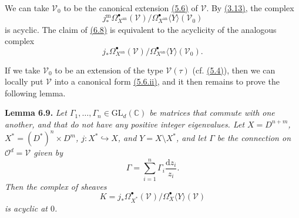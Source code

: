 \documentclass{report}
\newenvironment{itenv}[1]
  {\phantomsection\par\medskip\noindent\textbf{#1.}\itshape}
  {\par\medskip}
\renewcommand{\cal}[1]{{\mathcal{#1}}}
\newcommand{\CC}{\mathbb{C}}
\newcommand{\dd}{\mathrm{d}}
\newcommand{\GL}{\mathrm{GL}}
\newcommand{\an}{\mathrm{an}}
\newcommand{\mm}{\mathrm{m}}
\newcommand{\oldpage}[1]{\marginpar{\footnotesize$\Big\vert$ \textit{p.~#1}}}
\begin{document}
We can take $\cal{V}_0$ to be the canonical extension \hyperref[II.5.6]{(5.6)} of $\cal{V}$.
By \hyperref[II.3.13]{(3.13)}, the complex
\[
  j_*^\mm\Omega_{X^\an}^\bullet(\cal{V}) / \Omega_{X^\an}^\bullet\langle Y\rangle(\cal{V}_0)
\]
is acyclic.
The claim of \hyperref[II.6.8]{(6.8)} is equivalent to the acyclicity of the analogous complex
\[
\label{II.6.8.2}
  j_*\Omega_{X^\an}^\bullet(\cal{V}) / \Omega_{X^\an}^\bullet\langle Y\rangle(\cal{V}_0).
\tag{6.8.2}
\]

If we take $\cal{V}_0$ to be an extension of the type $\cal{V}(\tau)$ (cf. \hyperref[II.5.4]{(5.4)}), then we can locally put $\cal{V}$ into a canonical form \hyperref[II.5.6]{(5.6.ii)}, and it then remains to prove the following lemma.

\begin{itenv}{Lemma 6.9}
\label{II.6.9}
Let $\Gamma_1,\ldots,\Gamma_n\in\GL_d(\CC)$ be matrices that commute with one another, and that do not have any positive integer eigenvalues.
Let $X=D^{n+m}$, $X^*=(D^*)^n\times D^m$, $j\colon X^*\hookrightarrow X$, and $Y=X\setminus X^*$, and let $\Gamma$ be the connection on $\cal{O}^d=\cal{V}$ given by
\[
  \Gamma = \sum_{i=1}^n \Gamma_i \frac{\dd z_i}{z_i}.
\]
\oldpage{103}
Then the complex of sheaves
\[
  K = j_*\Omega_{X^*}^\bullet(\cal{V}) / \Omega_X^\bullet\langle Y\rangle(\cal{V})
\]
is acyclic at $0$.
\end{itenv}
\end{document}
